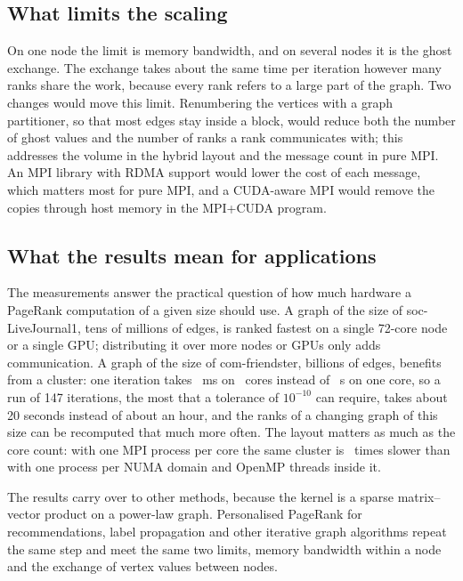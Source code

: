 \documentclass[11pt,a4paper]{article}
\begin{document}
\subsection{What limits the scaling}

On one node the limit is memory bandwidth, and on several nodes it is the ghost exchange. The exchange takes about
the same time per iteration however many ranks share the work, because every rank refers to a large part of the graph.
Two changes would move this limit. Renumbering the vertices with a graph partitioner, so that most edges stay inside
a block, would reduce both the number of ghost values and the number of ranks a rank communicates with; this
addresses the volume in the hybrid layout and the message count in pure MPI. An MPI library with RDMA support
would lower the cost of each message, which matters most for pure MPI, and a CUDA-aware MPI would remove the copies
through host memory in the MPI+CUDA program.

\subsection{What the results mean for applications}

The measurements answer the practical question of how much hardware a PageRank computation of a given size should
use. A graph of the size of soc-LiveJournal1, tens of millions of edges, is ranked fastest on a single 72-core node
or a single GPU; distributing it over more nodes or GPUs only adds communication. A graph of the size of
com-friendster, billions of edges, benefits from a cluster: one iteration takes \stFRbest~ms on \stFRbestc\ cores
instead of \stFRones~s on one core, so a run of 147 iterations, the most that a tolerance of $10^{-10}$ can
require, takes about 20 seconds instead of about an hour, and the ranks of a changing graph of this size can be
recomputed that much more often. The layout matters as much as the core count: with one MPI process
per core the same cluster is \stFRratio\ times slower than with one process per NUMA domain and OpenMP threads
inside it.

The results carry over to other methods, because the kernel is a sparse matrix--vector product on a power-law
graph. Personalised PageRank for recommendations, label propagation and other iterative graph algorithms repeat
the same step and meet the same two limits, memory bandwidth within a node and the exchange of vertex values between
nodes.

\end{document}
